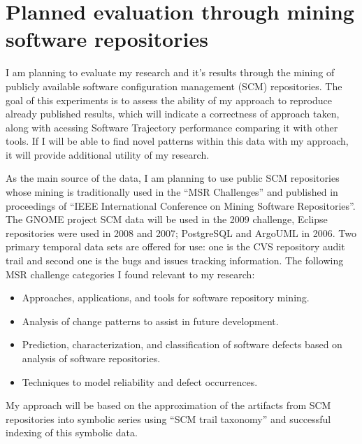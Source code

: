 \section{Planned evaluation through mining software repositories}\label{public.evaluation}
I am planning to evaluate my research and it's results through the mining of publicly available software configuration management (SCM) repositories. The goal of this experiments is to assess the ability of my approach to reproduce already published results, which will indicate a correctness of approach taken, along with acessing Software Trajectory performance comparing it with other tools. If I will be able to find novel patterns within this data with my approach, it will provide additional utility of my research.

As the main source of the data, I am planning to use public SCM repositories whose mining is traditionally used in the ``MSR Challenges'' \cite{citeulike:5043676} and published in proceedings of ``IEEE International Conference on Mining Software Repositories''. The GNOME project SCM data will be used in the 2009 challenge, Eclipse repositories were used in 2008 and 2007; PostgreSQL and ArgoUML in 2006. Two primary temporal data sets are offered for use: one is the CVS repository audit trail and second one is the bugs and issues tracking information. The following MSR challenge categories I found relevant to my research:
\begin{itemize}
  \item Approaches, applications, and tools for software repository mining.
  \item Analysis of change patterns to assist in future development.
	\item Prediction, characterization, and classification of software defects based on analysis of software repositories.
	\item Techniques to model reliability and defect occurrences.
\end{itemize}
My approach will be based on the approximation of the artifacts from SCM repositories into symbolic series using ``SCM trail taxonomy'' and successful indexing of this symbolic data. 

